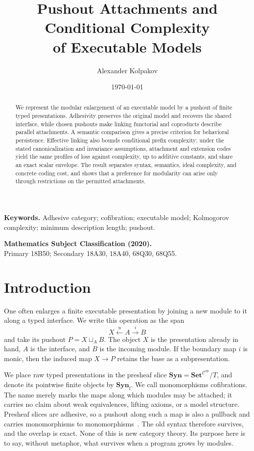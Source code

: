 \documentclass[11pt]{article}
\title{Pushout Attachments and Conditional Complexity \\ of Executable Models}
\author{Alexander Kolpakov}%
\date{\today}
\newcommand{\Syn}{\mathbf{Syn}}
\begin{document}
\maketitle

\begin{abstract}
We represent the modular enlargement of an executable model by a pushout of finite
typed presentations. Adhesivity preserves the original model and recovers
the shared interface, while chosen pushouts make linking functorial and
coproducts describe parallel attachments. A semantic comparison gives a
precise criterion for behavioral persistence. Effective linking also bounds
conditional prefix complexity; under the stated canonicalization and
invariance assumptions, attachment and extension codes yield the same profiles
of loss against complexity, up to additive constants, and share an exact
scalar envelope. The result separates syntax, semantics, ideal complexity,
and concrete coding cost, and shows that a preference for modularity can arise
only through restrictions on the permitted attachments.
\end{abstract}

\noindent\textbf{Keywords.}
Adhesive category; cofibration; executable model; Kolmogorov complexity;
minimum description length; pushout.

\smallskip
\noindent\textbf{Mathematics Subject Classification (2020).}\\
Primary 18B50; Secondary 18A30, 18A40, 68Q30, 68Q55.

\section{Introduction}

One often enlarges a finite executable presentation by joining a new module to
it along a typed interface.  We write this operation as the span
\[
 X\xleftarrow{u}A\xrightarrow{i}B
\]
and take its pushout \(P=X\sqcup_A B\).  The object \(X\) is the presentation
already in hand, \(A\) is the interface, and \(B\) is the incoming module.  If
the boundary map \(i\) is monic, then the induced map \(X\to P\) retains the
base as a subpresentation.

We place raw typed presentations in the presheaf slice
\(\Syn=\mathbf{Set}^{\mathcal C^{\mathrm{op}}}/T\), and denote its pointwise
finite objects by \(\Syn_{\mathrm f}\).  We call monomorphisms cofibrations.
The name merely marks the maps along which modules may be attached; it carries
no claim about weak equivalences, lifting axioms, or a model structure.
Presheaf slices are adhesive, so a pushout along such a map is also a pullback
and carries monomorphisms to monomorphisms~\cite{lack,toposes}.  The old syntax
therefore survives, and the overlap is exact.  None of this is new category
theory.  Its purpose here is to say, without metaphor, what survives when a
program grows by modules.
\end{document}
